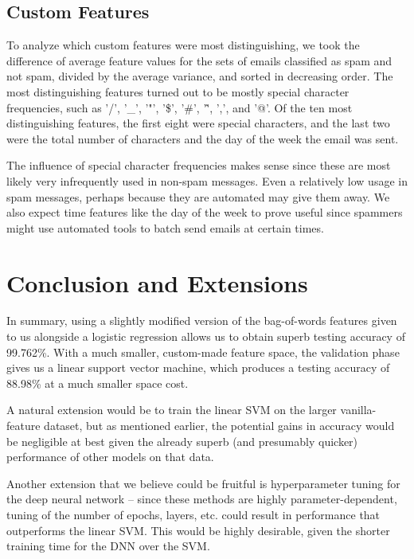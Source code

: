 \documentclass{article} %
\begin{document}
\subsection{Custom Features}
To analyze which custom features were most distinguishing, we took the difference of average feature values for the sets of emails classified as spam and not spam, divided by the average variance, and sorted in decreasing order. The most distinguishing features turned out to be mostly special character frequencies, such as '/', '\_', '"', '\$', '\#', '\^', ',', and '@'. Of the ten most distinguishing features, the first eight were special characters, and the last two were the total number of characters and the day of the week the email was sent. \par
The influence of special character frequencies makes sense since these are most likely very infrequently used in non-spam messages. Even a relatively low usage in spam messages, perhaps because they are automated may give them away. We also expect time features like the day of the week to prove useful since spammers might use automated tools to batch send emails at certain times.

\section{Conclusion and Extensions}
In summary, using a slightly modified version of the bag-of-words features given to us alongside a logistic regression allows us to obtain superb testing accuracy of 99.762\%.  With a much smaller, custom-made feature space, the validation phase gives us a linear support vector machine, which produces a testing accuracy of 88.98\% at a much smaller space cost.\par 
A natural extension would be to train the linear SVM on the larger vanilla-feature dataset, but as mentioned earlier, the potential gains in accuracy would be negligible at best given the already superb (and presumably quicker) performance of other models on that data.\par 
Another extension that we believe could be fruitful is hyperparameter tuning for the deep neural network -- since these methods are highly parameter-dependent, tuning of the number of epochs, layers, etc. could result in performance that outperforms the linear SVM.  This would be highly desirable, given the shorter training time for the DNN over the SVM.
\end{document}
